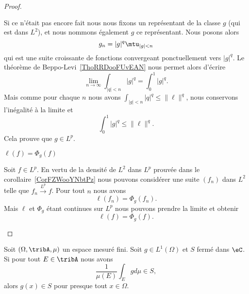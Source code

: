 \begin{proof}
\begin{subproof}
\begin{subproof}
                    Si ce n'était pas encore fait nous nous fixons un représentant de la classe \( g\) (qui est dans \( L^2\)), et nous nommons également \( g\) ce représentant. Nous posons alors
                    \begin{equation}
                        g_n=| g |^q\mtu_{| g |<n}
                    \end{equation}
                    qui est une suite croissante de fonctions convergeant ponctuellement vers \( | g |^q\). Le théorème de Beppo-Levi~\ref{ThoRRDooFUvEAN} nous permet alors d'écrire
                    \begin{equation}
                        \lim_{n\to \infty} \int_{| q |<n}| g |^q=\int_{0}^1| g |^q.
                    \end{equation}
                    Mais comme pour chaque \( n\) nous avons \( \int_{| g |<n}| q |^q\leq \| \ell \|^q\), nous conservons l'inégalité à la limite et
                    \begin{equation}
                        \int_0^1| g |^q\leq \| \ell \|^q.
                    \end{equation}
                    Cela prouve que \( g\in L^p\).

                \item[\( \ell(f)=\Phi_g(f)\)]

                    Soit \( f\in L^p\). En vertu de la densité de \( L^2\) dans \( L^p\) prouvée dans le corollaire~\ref{CorFZWooYNbtPz} nous pouvons considérer une suite \( (f_n)\) dans \( L^2\) telle que \( f_n\stackrel{L^p}{\longrightarrow}f\). Pour tout \( n\) nous avons
                    \begin{equation}
                        \ell(f_n)=\Phi_g(f_n).
                    \end{equation}
                    Mais \( \ell\) et \( \Phi_g\) étant continues sur \( L^p\) nous pouvons prendre la limite et obtenir
                    \begin{equation}
                        \ell(f)=\Phi_g(f).
                    \end{equation}
            \end{subproof}
        \end{subproof}
\end{proof}

\begin{lemma} \label{LemHNPEooHtMOGY}
    Soit \( (\Omega,\tribA,\mu)\) un espace mesuré fini. Soit \( g\in L^1(\Omega)\) et \( S\) fermé dans \( \eC\). Si pour tout \( E\in \tribA\) nous avons
    \begin{equation}
        \frac{1}{ \mu(E) }\int_Egd\mu\in S,
    \end{equation}
    alors \( g(x)\in S\) pour presque tout \( x\in \Omega\).
\end{lemma}

